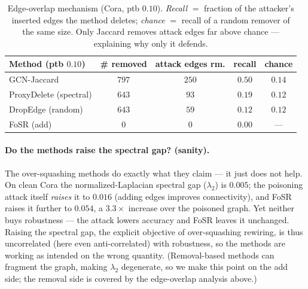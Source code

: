 \documentclass[11pt]{article}
\begin{document}
\begin{table}[t]
\centering\small
\begin{tabular}{@{}lcccc@{}}
\toprule
\textbf{Method} (ptb $0.10$) & \textbf{\# removed} & \textbf{attack edges rm.} & \textbf{recall} & \textbf{chance} \\
\midrule
GCN-Jaccard           & $797$ & $250$ & $\mathbf{0.50}$ & $0.14$ \\
ProxyDelete (spectral)& $643$ & $93$  & $0.19$ & $0.12$ \\
DropEdge (random)     & $643$ & $59$  & $0.12$ & $0.12$ \\
FoSR (add)            & $0$   & $0$   & $0.00$ & --- \\
\bottomrule
\end{tabular}
\caption{Edge-overlap mechanism (Cora, ptb $0.10$). \emph{Recall} $=$ fraction of the attacker's
inserted edges the method deletes; \emph{chance} $=$ recall of a random remover of the same size. Only
Jaccard removes attack edges far above chance --- explaining why only it defends.}
\label{tab:overlap}
\end{table}

\paragraph{Do the methods raise the spectral gap? (sanity).} The over-squashing methods do exactly what
they claim --- it just does not help. On clean Cora the normalized-Laplacian spectral gap ($\lambda_2$)
is $0.005$; the poisoning attack itself \emph{raises} it to $0.016$ (adding edges improves connectivity),
and FoSR raises it further to $0.054$, a $3.3\times$ increase over the poisoned graph. Yet neither buys
robustness --- the attack lowers accuracy and FoSR leaves it unchanged. Raising the spectral gap, the
explicit objective of over-squashing rewiring, is thus uncorrelated (here even anti-correlated) with
robustness, so the methods are working as intended on the wrong quantity. (Removal-based methods can
fragment the graph, making $\lambda_2$ degenerate, so we make this point on the add side; the removal
side is covered by the edge-overlap analysis above.)
\end{document}

